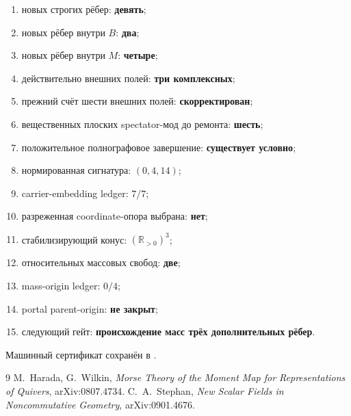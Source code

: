 \begin{protocol}\begin{enumerate}
\item новых строгих рёбер: \textbf{девять};
\item новых рёбер внутри $B$: \textbf{два};
\item новых рёбер внутри $M$: \textbf{четыре};
\item действительно внешних полей: \textbf{три комплексных};
\item прежний счёт шести внешних полей: \textbf{скорректирован};
\item вещественных плоских spectator-мод до ремонта: \textbf{шесть};
\item положительное полнографовое завершение: \textbf{существует условно};
\item нормированная сигнатура: \textbf{$(0,4,14)$};
\item carrier-embedding ledger: \textbf{$7/7$};
\item разреженная coordinate-опора выбрана: \textbf{нет};
\item стабилизирующий конус: \textbf{$(\mathbb R_{>0})^3$};
\item относительных массовых свобод: \textbf{две};
\item mass-origin ledger: \textbf{$0/4$};
\item portal parent-origin: \textbf{не закрыт};
\item следующий гейт: \textbf{происхождение масс трёх дополнительных рёбер}.
\end{enumerate}\end{protocol}

Машинный сертификат сохранён в
.

\begin{thebibliography}{9}
M.~Harada, G.~Wilkin,
\emph{Morse Theory of the Moment Map for Representations of Quivers},
arXiv:0807.4734.
C.~A.~Stephan,
\emph{New Scalar Fields in Noncommutative Geometry},
arXiv:0901.4676.
\end{thebibliography}